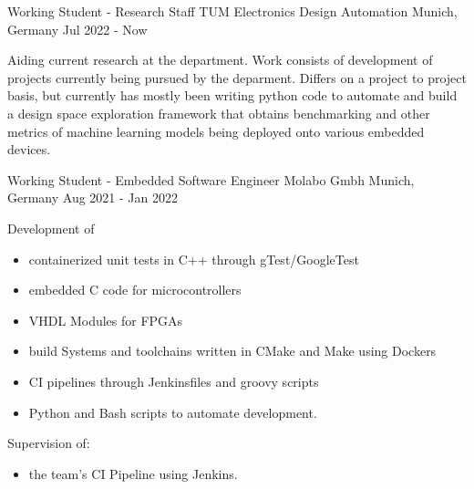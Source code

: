 
\begin{cventries}
  \cventry
    {Working Student - Research Staff} %
    {TUM Electronics Design Automation} %
    {Munich, Germany} %
    {Jul 2022 - Now} %
    {
      \begin{cvitems} %
          Aiding current research at the department. Work consists of development of projects currently being
          pursued by the deparment. Differs on a project to project basis, but currently has mostly been
          writing python code to automate and build a design space exploration framework that obtains
          benchmarking and other metrics of machine learning models being deployed onto various embedded devices.
      \end{cvitems}
    }
  \cventry
    {Working Student - Embedded Software Engineer} %
    {Molabo Gmbh} %
    {Munich, Germany} %
    {Aug 2021 - Jan 2022} %
    {
      \begin{cvitems} %
        \item {Development of}
            \begin{itemize}
                \item {containerized unit tests in C++ through gTest/GoogleTest}
                \item {embedded C code for microcontrollers}
                \item {VHDL Modules for FPGAs}
                \item {build Systems and toolchains written in CMake and Make using Dockers}
                \item {CI pipelines through Jenkinsfiles and groovy scripts}
                \item {Python and Bash scripts to automate development.}
            \end{itemize}
        \item {Supervision of:}
          \begin{itemize}
            \item {the team's CI Pipeline using Jenkins.}
          \end{itemize}
      \end{cvitems}
    }



\end{cventries}
